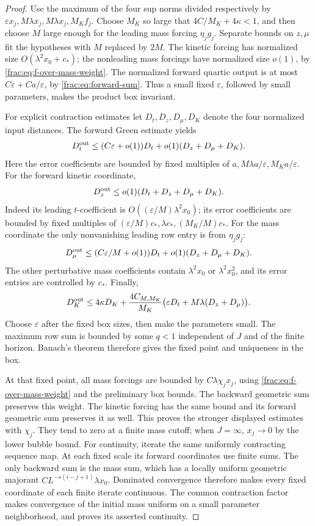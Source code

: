\documentclass[11pt]{article}
\begin{document}
\begin{proof}
Use the maximum of the four sup norms divided respectively by
\(\varepsilon x_j,M\lambda x_j,M\lambda x_j,M_Kf_j\).
Choose \(M_K\) so large that \(4C/M_K+4\kappa<1\), and then
choose \(M\) large enough for the leading mass forcing
\(\eta_jg_j\). Separate bounds on \(z,\mu\) fit the hypotheses
with \(M\) replaced by \(2M\). The kinetic forcing has normalized
size \(O(\lambda^2x_0+c_*)\); the nonleading mass forcings have
normalized size \(o(1)\), by
\eqref{frac:eq:f-over-mass-weight}. The normalized forward quartic
output is at most \(C\varepsilon+Ca/\varepsilon\), by
\eqref{frac:eq:forward-sum}. Thus a small fixed \(\varepsilon\),
followed by small parameters, makes the product box invariant.

For explicit contraction estimates let
\(D_t,D_z,D_\mu,D_K\) denote the four normalized input distances.
The forward Green estimate yields
\[
 D_t^{\rm out}\le(C\varepsilon+o(1))D_t
                       +o(1)(D_z+D_\mu+D_K).
\]
Here the error coefficients are bounded by fixed multiples of
\(a,M\lambda a/\varepsilon,M_Ka/\varepsilon\).
For the forward kinetic coordinate,
\[
 D_z^{\rm out}\le o(1)(D_t+D_z+D_\mu+D_K).
\]
Indeed its leading \(t\)-coefficient is
\(O((\varepsilon/M)\lambda^2x_0)\); its error coefficients are
bounded by fixed multiples of
\((\varepsilon/M)c_*,\lambda c_*,(M_K/M)c_*\).
For the mass coordinate the only nonvanishing leading row entry is
from \(\eta_jg_j\):
\[
 D_\mu^{\rm out}\le(C\varepsilon/M+o(1))D_t
                         +o(1)(D_z+D_\mu+D_K).
\]
The other perturbative mass coefficients contain
\(\lambda^2x_0\) or \(\lambda^2x_0^2\), and its error entries
are controlled by \(c_*\). Finally,
\[
 D_K^{\rm out}\le4\kappa D_K+
 \frac{4C_{M,M_K}}{M_K}
       \bigl(\varepsilon D_t+M\lambda(D_z+D_\mu)\bigr).
\]
Choose \(\varepsilon\) after the fixed box sizes, then make the
parameters small. The maximum row sum is bounded by some \(q<1\)
independent of \(J\) and of the finite horizon. Banach's theorem
therefore gives the fixed point and uniqueness in the box.

At that fixed point, all mass forcings are bounded by
\(C\lambda\chi_jx_j\), using
\eqref{frac:eq:f-over-mass-weight} and the preliminary box bounds.
The backward geometric sum preserves this weight. The kinetic
forcing has the same bound and its forward geometric sum preserves
it as well. This proves the stronger displayed estimates with
\(\chi_j\). They tend to zero at a finite mass cutoff; when
\(J=\infty\), \(x_j\to0\) by the lower bubble bound.
For continuity, iterate the same uniformly contracting sequence map.
At each fixed scale its forward coordinates use finite sums. The only
backward sum is the mass sum, which has a locally uniform geometric
majorant \(CL^{-s(i-j+1)}\lambda x_0\). Dominated convergence
therefore makes every fixed coordinate of each finite iterate
continuous. The common contraction factor makes convergence of the
initial mass uniform on a small parameter neighborhood, and proves
its asserted continuity.
\end{proof}
\end{document}
